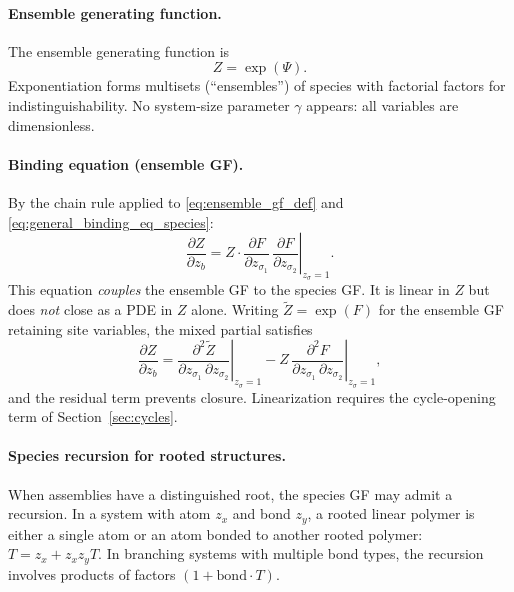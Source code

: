 \documentclass[11pt]{amsart}
\newcommand{\GFspecies}{F}
\newcommand{\GFensemble}{Z}
\newcommand{\GFcomb}{\Psi}
\newcommand{\PDeriv}[2]{\frac{\partial #1}{\partial #2}}
\theoremstyle{definition}
\theoremstyle{plain}
\theoremstyle{remark}
\begin{document}
\paragraph{Ensemble generating function.}
The ensemble generating function is
\begin{equation}\label{eq:ensemble_gf_def}
\GFensemble = \exp(\GFcomb).
\end{equation}
Exponentiation forms multisets (``ensembles'') of species with factorial factors for indistinguishability.
No system-size parameter $\gamma$ appears: all variables are dimensionless.

\paragraph{Binding equation (ensemble GF).}
By the chain rule applied to \eqref{eq:ensemble_gf_def} and \eqref{eq:general_binding_eq_species}:
\begin{equation}\label{eq:general_binding_eq_ensemble}
\PDeriv{\GFensemble}{z_b}
= \GFensemble \cdot \left.\PDeriv{\GFspecies}{z_{\sigma_1}}\,\PDeriv{\GFspecies}{z_{\sigma_2}}\right|_{z_\sigma=1}.
\end{equation}
This equation \emph{couples} the ensemble GF to the species GF.
It is linear in $\GFensemble$ but does \emph{not} close as a PDE in $\GFensemble$ alone.
Writing $\widetilde{\GFensemble} = \exp(\GFspecies)$ for the ensemble GF retaining site variables, the mixed partial satisfies
\begin{equation}\label{eq:general_binding_eq_ensemble_corrected}
\PDeriv{\GFensemble}{z_b}
= \left.\frac{\partial^2\widetilde{\GFensemble}}{\partial z_{\sigma_1}\,\partial z_{\sigma_2}}\right|_{z_\sigma=1}
- \GFensemble\,\left.\frac{\partial^2\GFspecies}{\partial z_{\sigma_1}\,\partial z_{\sigma_2}}\right|_{z_\sigma=1},
\end{equation}
and the residual term prevents closure.
Linearization requires the cycle-opening term of Section~\ref{sec:cycles}.

\paragraph{Species recursion for rooted structures.}
When assemblies have a distinguished root, the species GF may admit a recursion.
In a system with atom $z_x$ and bond $z_y$, a rooted linear polymer is either a single atom or an atom bonded to another rooted polymer: $T = z_x + z_x z_y T$.
In branching systems with multiple bond types, the recursion involves products of factors $(1+\text{bond}\cdot T)$.
\end{document}
